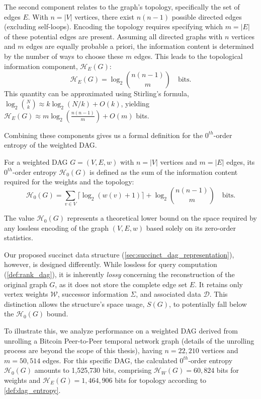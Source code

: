 The second component relates to the graph's topology, specifically the set of edges $E$. With $n = |V|$ vertices, there exist $n(n-1)$ possible directed edges (excluding self-loops). Encoding the topology requires specifying which $m = |E|$ of these potential edges are present. Assuming all directed graphs with $n$ vertices and $m$ edges are equally probable a priori, the information content is determined by the number of ways to choose these $m$ edges. This leads to the topological information component, $\mathcal{H}_E(G)$:
\[ \mathcal{H}_E(G) = \log_2 \binom{n(n-1)}{m} \quad \text{bits}. \]
This quantity can be approximated using Stirling's formula, $\log_2 \binom{N}{k} \approx k \log_2(N/k) + O(k)$, yielding $\mathcal{H}_E(G) \approx m \log_2 \left( \frac{n(n-1)}{m} \right) + O(m)$ bits.

Combining these components gives us a formal definition for the $0^{th}$-order entropy of the weighted DAG.

\begin{definition}
    \label{def:dag_entropy}
    For a weighted DAG $G = (V, E, w)$ with $n=|V|$ vertices and $m=|E|$ edges, its $0^{th}$-order entropy $\mathcal{H}_0(G)$ is defined as the sum of the information content required for the weights and the topology:
    \[ \mathcal{H}_0(G) = \sum_{v \in V} \lceil \log_2 (w(v)+1) \rceil + \log_2 \binom{n(n-1)}{m} \quad \text{bits}. \]
\end{definition}

The value $\mathcal{H}_0(G)$ represents a theoretical lower bound on the space required by any lossless encoding of the graph $(V, E, w)$ based solely on its zero-order statistics.

Our proposed succinct data structure (\autoref{sec:succinct_dag_representation}), however, is designed differently. While lossless for \Rank{} query computation (\ref{def:rank_dag}), it is inherently \emph{lossy} concerning the reconstruction of the original graph $G$, as it does not store the complete edge set $E$. It retains only vertex weights $\mathcal{W}$, successor information $\Sigma$, and associated data $\mathcal{D}$. This distinction allows the structure's space usage, $S(G)$, to potentially fall below the $\mathcal{H}_0(G)$ bound.

To illustrate this, we analyze performance on a weighted DAG derived from unrolling a Bitcoin Peer-to-Peer temporal network graph (details of the unrolling process are beyond the scope of this thesis), having $n = 22,210$ vertices and $m = 50,514$ edges. For this specific DAG, the calculated $0^{th}$-order entropy $\mathcal{H}_0(G)$ amounts to 1,525,730 bits, comprising $\mathcal{H}_W(G) = 60,824$ bits for weights and $\mathcal{H}_E(G) = 1,464,906$ bits for topology according to \ref{def:dag_entropy}.

